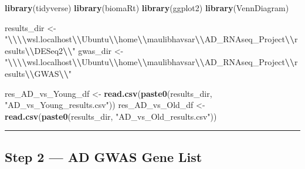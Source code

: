 \documentclass[
]{article}
\newenvironment{Shaded}{\begin{snugshade}}{\end{snugshade}}
\newcommand{\FunctionTok}[1]{\textcolor[rgb]{0.13,0.29,0.53}{\textbf{#1}}}
\newcommand{\NormalTok}[1]{#1}
\newcommand{\OtherTok}[1]{\textcolor[rgb]{0.56,0.35,0.01}{#1}}
\newcommand{\SpecialCharTok}[1]{\textcolor[rgb]{0.81,0.36,0.00}{\textbf{#1}}}
\newcommand{\StringTok}[1]{\textcolor[rgb]{0.31,0.60,0.02}{#1}}
\begin{document}
\begin{Shaded}
\begin{Highlighting}[]
\FunctionTok{library}\NormalTok{(tidyverse)}
\FunctionTok{library}\NormalTok{(biomaRt)}
\FunctionTok{library}\NormalTok{(ggplot2)}
\FunctionTok{library}\NormalTok{(VennDiagram)}

\NormalTok{results\_dir }\OtherTok{\textless{}{-}} \StringTok{"}\SpecialCharTok{\textbackslash{}\textbackslash{}\textbackslash{}\textbackslash{}}\StringTok{wsl.localhost}\SpecialCharTok{\textbackslash{}\textbackslash{}}\StringTok{Ubuntu}\SpecialCharTok{\textbackslash{}\textbackslash{}}\StringTok{home}\SpecialCharTok{\textbackslash{}\textbackslash{}}\StringTok{maulibhavsar}\SpecialCharTok{\textbackslash{}\textbackslash{}}\StringTok{AD\_RNAseq\_Project}\SpecialCharTok{\textbackslash{}\textbackslash{}}\StringTok{results}\SpecialCharTok{\textbackslash{}\textbackslash{}}\StringTok{DESeq2}\SpecialCharTok{\textbackslash{}\textbackslash{}}\StringTok{"}
\NormalTok{gwas\_dir    }\OtherTok{\textless{}{-}} \StringTok{"}\SpecialCharTok{\textbackslash{}\textbackslash{}\textbackslash{}\textbackslash{}}\StringTok{wsl.localhost}\SpecialCharTok{\textbackslash{}\textbackslash{}}\StringTok{Ubuntu}\SpecialCharTok{\textbackslash{}\textbackslash{}}\StringTok{home}\SpecialCharTok{\textbackslash{}\textbackslash{}}\StringTok{maulibhavsar}\SpecialCharTok{\textbackslash{}\textbackslash{}}\StringTok{AD\_RNAseq\_Project}\SpecialCharTok{\textbackslash{}\textbackslash{}}\StringTok{results}\SpecialCharTok{\textbackslash{}\textbackslash{}}\StringTok{GWAS}\SpecialCharTok{\textbackslash{}\textbackslash{}}\StringTok{"}

\NormalTok{res\_AD\_vs\_Young\_df }\OtherTok{\textless{}{-}} \FunctionTok{read.csv}\NormalTok{(}\FunctionTok{paste0}\NormalTok{(results\_dir,}
                                       \StringTok{"AD\_vs\_Young\_results.csv"}\NormalTok{))}
\NormalTok{res\_AD\_vs\_Old\_df   }\OtherTok{\textless{}{-}} \FunctionTok{read.csv}\NormalTok{(}\FunctionTok{paste0}\NormalTok{(results\_dir,}
                                       \StringTok{"AD\_vs\_Old\_results.csv"}\NormalTok{))}
\end{Highlighting}
\end{Shaded}

\begin{center}\rule{0.5\linewidth}{0.5pt}\end{center}

\subsection{Step 2 --- AD GWAS Gene
List}\label{step-2-ad-gwas-gene-list}
\end{document}

